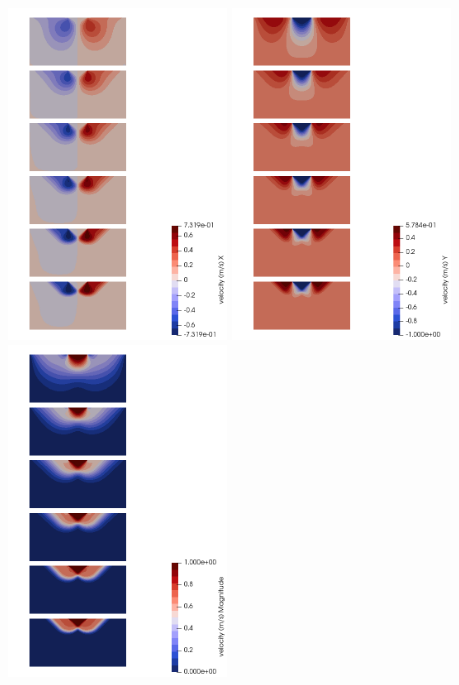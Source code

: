 \begin{center}
\includegraphics[width=5.8cm]{python_codes/fieldstone_87/results/experiment_09/meth3/u}
\includegraphics[width=5.8cm]{python_codes/fieldstone_87/results/experiment_09/meth3/v}
\includegraphics[width=5.8cm]{python_codes/fieldstone_87/results/experiment_09/meth3/vel}\\

\end{center}
